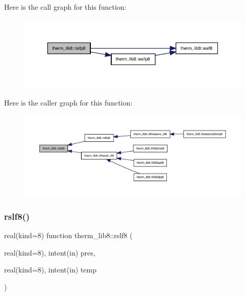Here is the call graph for this function\+:
\nopagebreak
\begin{figure}[H]
\begin{center}
\leavevmode
\includegraphics[width=350pt]{namespacetherm__lib8_ad59e6dc4fe8995e92cdae7dd3a340efc_cgraph}
\end{center}
\end{figure}
Here is the caller graph for this function\+:
\nopagebreak
\begin{figure}[H]
\begin{center}
\leavevmode
\includegraphics[width=350pt]{namespacetherm__lib8_ad59e6dc4fe8995e92cdae7dd3a340efc_icgraph}
\end{center}
\end{figure}
\mbox{\label{namespacetherm__lib8_ae2428f5fab9f3796e437eee297f7972b}} 
\subsubsection{\texorpdfstring{rslf8()}{rslf8()}}
{\footnotesize\ttfamily real(kind=8) function therm\+\_\+lib8\+::rslf8 (\begin{DoxyParamCaption}\item[{real(kind=8), intent(in)}]{pres,  }\item[{real(kind=8), intent(in)}]{temp }\end{DoxyParamCaption})}

